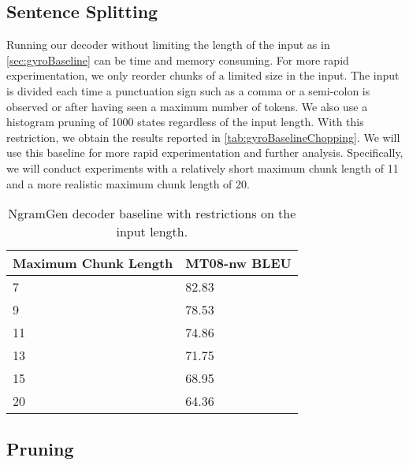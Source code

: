\subsection{Sentence Splitting}

Running our decoder without limiting the length of the input
as in \autoref{sec:gyroBaseline} can be time and memory consuming.
For more rapid experimentation, we only reorder chunks of a limited
size in the
input. The input is divided each time a punctuation sign such
as a comma or a semi-colon is observed or after having seen a maximum
number of tokens. We also use a histogram pruning of 1000 states
regardless of the input length.
With this restriction, we obtain the results reported
in \autoref{tab:gyroBaselineChopping}. We will use this baseline
for more rapid experimentation and further analysis. Specifically,
we will conduct experiments with a relatively short maximum chunk
length of 11 and a more realistic maximum chunk length of 20.

\begin{table}
  \begin{center}
  \begin{tabular}{l|l}
    Maximum Chunk Length & MT08-nw BLEU \\
    \hline
    7 & 82.83 \\
    9 & 78.53 \\
    11 & 74.86 \\
    13 & 71.75 \\
    15 & 68.95 \\
    20 & 64.36 \\
  \end{tabular}
  \caption{NgramGen decoder baseline with restrictions on the input length.}
  \label{tab:gyroBaselineChopping}
  \end{center}
\end{table}

\subsection{Pruning}

